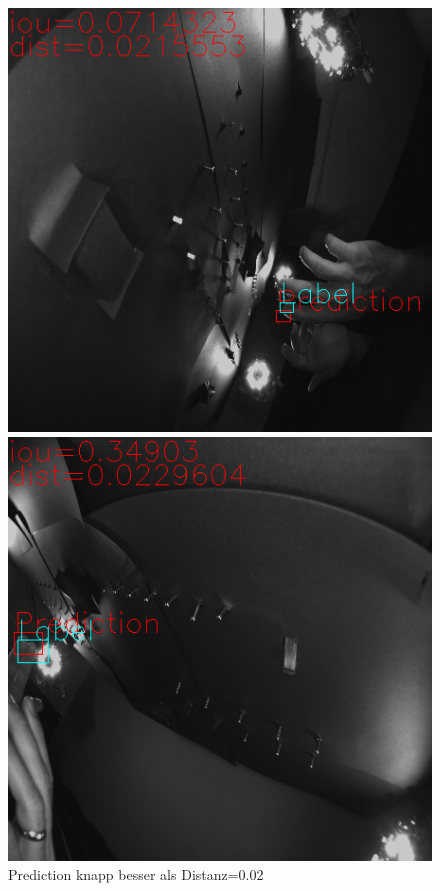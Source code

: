 \begin{figure}
\begin{minipage}[b]{0.48\textwidth}
	\end{minipage}
	\caption{Prediction knapp besser als Distanz=0.02}
	\label{img:distanz_knapp_gut}
	\begin{verbatim}
	\end{verbatim}
	\centering
	\begin{minipage}[b]{0.48\textwidth}	
		\includegraphics[width=\textwidth]{Kapitel/70Resultate/Bilder/3distKnappSchlecht.png}
	\end{minipage}
	\hfill
	\begin{minipage}[b]{0.48\textwidth}		
		\includegraphics[width=\textwidth]{Kapitel/70Resultate/Bilder/4distKnappSchlecht.png}

\end{minipage}
\end{figure}
